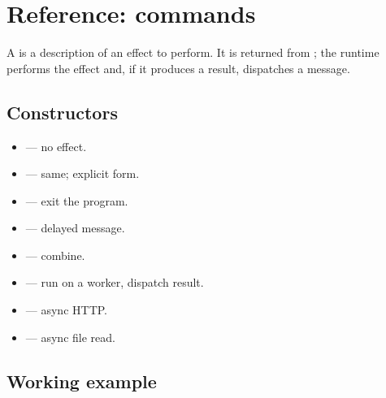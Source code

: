 \chapter{Reference: commands}
\label{ch:refman-cmd}

\begin{aside}
A  is a description of an effect to perform.
It is returned from ; the runtime performs the
effect and, if it produces a result, dispatches a message.
\end{aside}

\section{Constructors}

\begin{itemize}[leftmargin=*]
  \item {} — no effect.
  \item {} — same; explicit form.
  \item {} — exit the program.
  \item {} — delayed message.
  \item {} — combine.
  \item {} — run on a
    worker, dispatch result.
  \item {} — async
    HTTP.
  \item {} — async
    file read.
\end{itemize}

\section{Working example}

